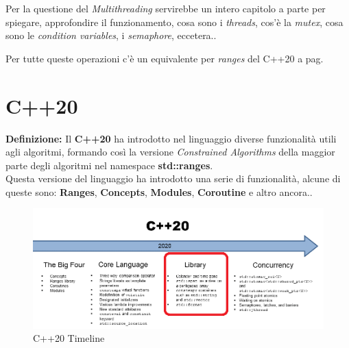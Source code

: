 \textsf{\small Per la questione del \emph{Multithreading} servirebbe un intero capitolo a parte per spiegare, approfondire il funzionamento, cosa sono i \emph{threads}, cos'è la \emph{mutex}, cosa sono le \emph{condition variables}, i \emph{semaphore}, eccetera..} \\


\fleuron

\textsf{\small Per tutte queste operazioni c'è un equivalente per \emph{ranges} del C++20 a pag. \pageref{ranges}} \\


\newpage


\section{C++20}

\textsf{\small \textbf{Definizione: } Il \textbf{C++20} ha introdotto nel linguaggio diverse funzionalità utili agli algoritmi, formando così la versione \emph{Constrained Algorithms} della maggior parte degli algoritmi nel namespace \textbf{std::ranges}. } \\

\textsf{\small Questa versione del linguaggio ha introdotto una serie di funzionalità, alcune di queste sono: \textbf{Ranges}, \textbf{Concepts}, \textbf{Modules}, \textbf{Coroutine} e altro ancora..} \\

\begin{figure}[H]
	\centering
	\includegraphics[width=1.2\textwidth, height=1.2\textheight, keepaspectratio]{./imgs/TimelineCpp20_3.png}
	\caption{C++20 Timeline}
	\label{fig:TimelineCpp20_3}
\end{figure}

